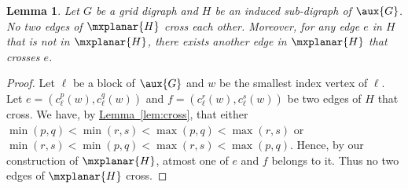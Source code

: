 \documentclass[11pt]{article}
\numberwithin{equation}{section}
\newtheorem{lemma}[theorem]{Lemma}
\theoremstyle{definition}
\theoremstyle{plain}
\newcommand{\expref}[2]{\hyperref[#2]{#1~\ref{#2}}}
\begin{document}
\begin{lemma}
\label{lem:planarG}
Let $G$ be a grid %
digraph %
and $H$ be
%
 an induced  %
sub-digraph %
 of $\aux{G}$. No two edges of $\mxplanar{H}$ cross each other. Moreover, for any edge $e$ in $H$ that is not in $\mxplanar{H}$, there exists another edge in $\mxplanar{H}$ that crosses $e$.
\end{lemma}
\begin{proof}
Let ${\ell}$ be a block of $\aux{G}$ and $w$ be the smallest index vertex of ${\ell}$. Let $e = (c^p_{\ell}(w), c^q_{\ell}(w))$ and $f = (c^r_{\ell}(w), c^s_{\ell}(w))$ be two edges of $H$ that cross. We have, by \expref{Lemma}{lem:cross}, that either $\min(p,q) < \min(r, s) < \max(p, q) < \max(r, s)$ or $\min(r,s) < \min(p, q) < \max(r, s) < \max(p, q)$. Hence, by our construction of $\mxplanar{H}$, atmost one of $e$ and $f$ belongs to it. Thus no two edges of $\mxplanar{H}$ %
 cross.


\end{proof}
\end{document}

